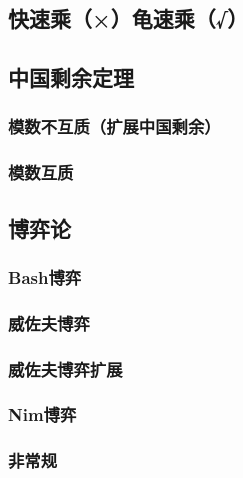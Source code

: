 \documentclass{article}
\begin{document}
\subsection{快速乘（×）龟速乘（√）}


\subsection{中国剩余定理}
\subsubsection{模数不互质（扩展中国剩余）}

\subsubsection{模数互质}


\subsection{博弈论}
\subsubsection{Bash博弈}

\subsubsection{威佐夫博弈}

\subsubsection{威佐夫博弈扩展}

\subsubsection{Nim博弈}

\subsubsection{非常规}
\begin{figure}[htb] 
 \end{figure}

\end{document}
